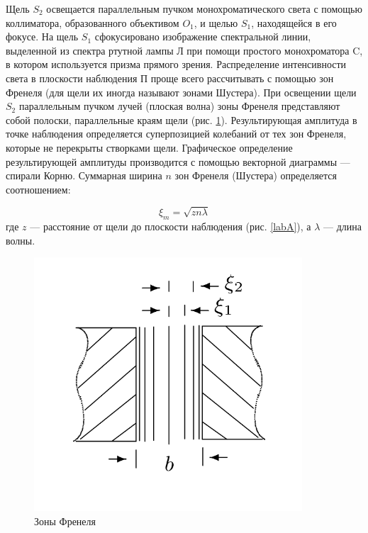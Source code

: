 \documentclass[a4paper,12pt]{article}
\begin{document}
Щель $ S_2 $ освещается параллельным пучком монохроматического света с помощью коллиматора, образованного объективом $ O_1 $, и щелью $S_1$, 
находящейся в его фокусе. На щель $ S_1 $ сфокусировано изображение спектральной линии, выделенной из спектра ртутной лампы Л 
при помощи простого монохроматора C, в котором используется призма прямого зрения. 
Распределение интенсивности света в плоскости наблюдения П проще всего рассчитывать с помощью зон Френеля 
(для щели их иногда называют зонами Шустера). При освещении щели $ S_2 $ параллельным пучком лучей (плоская волна) 
зоны Френеля представляют собой полоски, параллельные краям щели (рис. \ref{zone}). 
Результирующая амплитуда в точке наблюдения определяется суперпозицией колебаний от тех зон Френеля, 
которые не перекрыты створками щели. Графическое определение результирующей амплитуды производится с помощью векторной диаграммы --- спирали Корню. 
Суммарная ширина $ n $ зон Френеля (Шустера) определяется соотношением:

\begin{equation}\label{xin}
\xi_m = \sqrt{zn\lambda}
\end{equation}
где $ z $ --- расстояние от щели до плоскости наблюдения (рис. \ref{labA}), а $ \lambda $ --- длина волны.

\begin{figure}[H]
	\begin{center}
		\includegraphics[scale=0.9]{зоны.png}
	\end{center}
	\caption{Зоны Френеля}
	\label{zone}
\end{figure}
\end{document}
